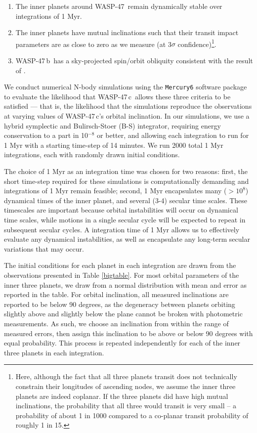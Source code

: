 \documentclass{emulateapj}
\newcommand{\thisstar}{WASP-47}
\newcommand{\thisfirstplanet}{WASP-47\,b}
\newcommand{\thisfourthplanet}{WASP-47\,c}
\begin{document}
\begin{enumerate}
\item The inner planets around \thisstar\ remain dynamically stable over integrations of 1 Myr. 
\item The inner planets have mutual inclinations such that their transit impact parameters are as close to zero as we measure (at 3$\sigma$ confidence)\footnote{Here, although the fact that all three planets transit does not technically constrain their longitudes of ascending nodes, we assume the inner three planets are indeed coplanar. If the three planets did have high mutual inclinations, the probability that all three would transit is very small -- a probability of about 1 in 1000 compared to a co-planar transit probability of roughly 1 in 15.}. 
\item \thisfirstplanet\ has a sky-projected spin/orbit obliquity consistent with the result of \citet{sanchisojedaw47rm}. 
\end{enumerate}

We conduct numerical N-body simulations using the \texttt{Mercury6} \citep{mercury6} software package to evaluate the likelihood that \thisfourthplanet\ allows these three criteria to be satisfied --- that is, the likelihood that the simulations reproduce the observations at varying values of \thisfourthplanet's orbital inclination. In our simulations, we use a hybrid symplectic and Bulirsch-Stoer (B-S) integrator, requiring energy conservation to a part in 10$^{-8}$ or better, and allowing each integration to run for 1 Myr with a starting time-step of 14 minutes. We run 2000 total 1 Myr integrations, each with randomly drawn initial conditions. 

The choice of 1 Myr as an integration time was chosen for two reasons: first, the short time-step required for these simulations is computationally demanding and integrations of 1 Myr remain feasible; second, 1 Myr encapsulates many ($>10^{8}$) dynamical times of the inner planet, and several (3-4) secular time scales. These timescales are important because orbital instabilities will occur on dynamical time scales, while motions in a single secular cycle will be expected to repeat in subsequent secular cycles. A integration time of 1 Myr allows us to effectively evaluate any dynamical instabilities, as well as encapsulate any long-term secular variations that may occur. 

The initial conditions for each planet in each integration are drawn from the observations presented in Table \ref{bigtable}. For most orbital parameters of the inner three planets, we draw from a normal distribution with mean and error as reported in the table. For orbital inclination, all measured inclinations are reported to be below 90 degrees, as the degeneracy between planets orbiting slightly above and slightly below the plane cannot be broken with photometric measurements. As such, we choose an inclination from within the range of measured errors, then assign this inclination to be above or below 90 degrees with equal probability. This process is repeated independently for each of the inner three planets in each integration. 
\end{document}
